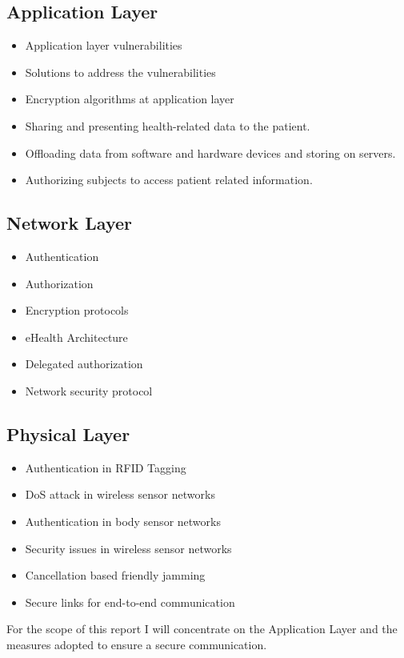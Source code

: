 \documentclass[letterpaper, 10 pt, conference]{ieeeconf}  %
\begin{document}
\subsection{Application Layer}
\begin{itemize}
\item Application layer vulnerabilities
\item Solutions to address the vulnerabilities
\item Encryption algorithms at application layer
\item Sharing and presenting health-related data to the patient.
\item Offloading data from software and hardware devices and storing on servers.
\item Authorizing subjects to access patient related information.
\end{itemize}
\subsection{Network Layer}
\begin{itemize}
\item Authentication
\item Authorization
\item Encryption protocols
\item eHealth Architecture
\item Delegated authorization
\item Network security protocol
\end{itemize}
\subsection{Physical Layer}
\begin{itemize}
\item Authentication in RFID Tagging
\item DoS attack in wireless sensor networks
\item Authentication in body sensor networks
\item Security issues in wireless sensor networks
\item Cancellation based friendly jamming
\item Secure links for end-to-end communication
\end{itemize}
For the scope of this report I will concentrate on the Application Layer and the measures adopted to ensure a secure communication.
\end{document}
